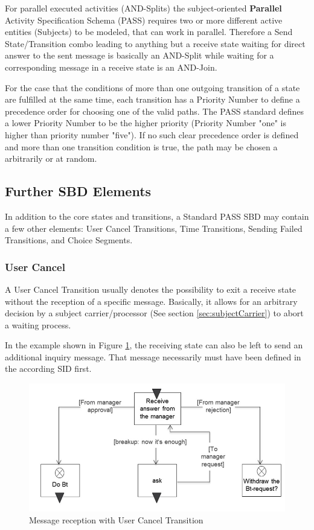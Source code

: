 For parallel executed activities (AND-Splits) the subject-oriented \textbf{Parallel} Activity Specification Schema (PASS) requires two or more different active entities (Subjects) to be modeled, that can work in parallel. Therefore a Send State/Transition combo leading to anything but a receive state waiting for direct answer to the sent message is basically an AND-Split while waiting for a corresponding message in a receive state is an AND-Join. 

For the case that the conditions of more than one outgoing transition of a state are fulfilled at the same time, each transition has a Priority Number to define a precedence order for choosing one of the valid paths. The PASS standard defines a lower Priority Number to be the higher priority (Priority Number "one" is higher than priority number "five"). If no such clear precedence order is defined and more than one transition condition is true, the path may be chosen a arbitrarily or at random.

\subsection{Further SBD Elements}

In addition to the core states and transitions, a Standard PASS SBD may contain a few other elements: User Cancel Transitions, Time Transitions, Sending Failed Transitions, and Choice Segments. 

\subsubsection{User Cancel}

A User Cancel Transition usually denotes the possibility to exit a receive state without the reception of a specific message. Basically, it allows for an arbitrary decision by a subject carrier/processor (See section \ref{sec:subjectCarrier}) to abort a waiting process.

In the example shown in Figure \ref{fig:receivestatebreak}, the receiving state can also be left to send an additional inquiry message. That message necessarily must have been defined in the according SID first.

\begin{figure}[htbp]
	\centering
	\includegraphics[width=0.7\linewidth]{Figures/Ontology/SubjectBehavior/ReceiveStateBreak}
	\caption[Message reception with User Cancel Transition]{Message reception with User Cancel Transition}
	\label{fig:receivestatebreak}
\end{figure}

